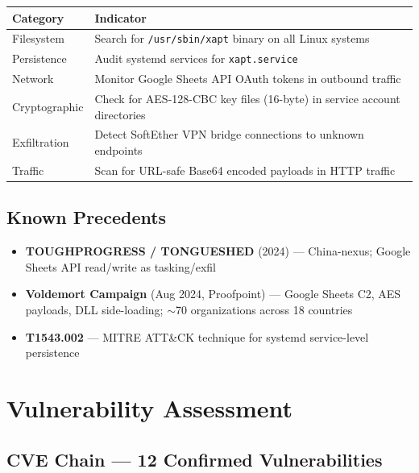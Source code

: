 \documentclass[11pt,a4paper]{article}
\begin{document}
\begin{tabularx}{\textwidth}{lX}
\toprule
\textbf{Category} & \textbf{Indicator} \\
\midrule
Filesystem & Search for \texttt{/usr/sbin/xapt} binary on all Linux systems \\
Persistence & Audit systemd services for \texttt{xapt.service} \\
Network & Monitor Google Sheets API OAuth tokens in outbound traffic \\
Cryptographic & Check for AES-128-CBC key files (16-byte) in service account directories \\
Exfiltration & Detect SoftEther VPN bridge connections to unknown endpoints \\
Traffic & Scan for URL-safe Base64 encoded payloads in HTTP traffic \\
\bottomrule
\end{tabularx}

\subsection{Known Precedents}

\begin{itemize}
  \item \textbf{TOUGHPROGRESS / TONGUESHED} (2024) — China-nexus; Google Sheets API read/write as tasking/exfil
  \item \textbf{Voldemort Campaign} (Aug 2024, Proofpoint) — Google Sheets C2, AES payloads, DLL side-loading; $\sim$70 organizations across 18 countries
  \item \textbf{T1543.002} — MITRE ATT\&CK technique for systemd service-level persistence
\end{itemize}

\section{Vulnerability Assessment}

\subsection{CVE Chain — 12 Confirmed Vulnerabilities}
\end{document}
